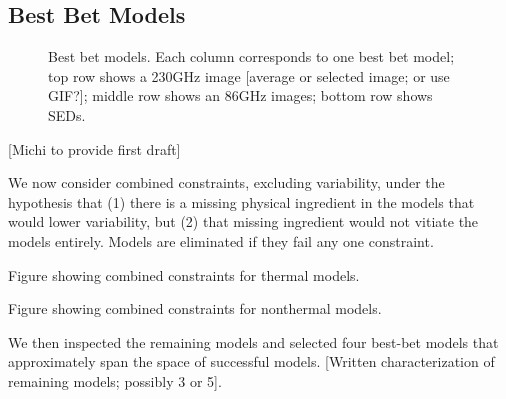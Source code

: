 
\subsection{Best Bet Models}

\begin{figure}
    \caption{Best bet models.  Each column corresponds to one best bet model; top row shows a 230GHz image [average or selected image; or use GIF?]; middle row shows an 86GHz images; bottom row shows SEDs.}
    \label{fig:my_label}
\end{figure}

[Michi to provide first draft]

We now consider combined constraints, excluding variability, under the hypothesis that (1) there is a missing physical ingredient in the models that would lower variability, but (2) that missing ingredient would not vitiate the models entirely.  Models are eliminated if they fail any one constraint.

Figure showing combined constraints for thermal models.

Figure showing combined constraints for nonthermal models.

We then inspected the remaining models and selected four best-bet models that approximately span the space of successful models.  [Written characterization of remaining models; possibly 3 or 5].
